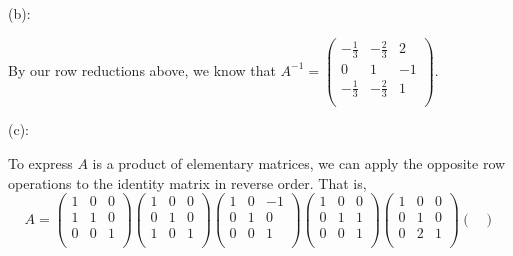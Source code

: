 \documentclass{eh-homework}
\begin{document}
\begin{question}{2}
        \medskip

        (b):

        By our row reductions above, we know that \(A^{-1} = \begin{pmatrix}
            -\frac{1}{3} & -\frac{2}{3} & 2 \\
            0 & 1 & -1 \\
            -\frac{1}{3} & -\frac{2}{3} & 1 \\
        \end{pmatrix}\).

        \medskip

        (c):

        To express \(A\) is a product of elementary matrices, we can apply the opposite row operations to the identity matrix in reverse order. That is,
        \[
            A = \begin{pmatrix}
                1 & 0 &  0 \\
                1 & 1 &  0 \\
                0 & 0 &  1 \\
            \end{pmatrix}
            \begin{pmatrix}
                1 & 0 &  0 \\
                0 & 1 &  0 \\
                1 & 0 &  1 \\
            \end{pmatrix}
            \begin{pmatrix}
                1 & 0 &  -1 \\
                0 & 1 &  0 \\
                0 & 0 &  1 \\
            \end{pmatrix}
            \begin{pmatrix}
                1 & 0 &  0 \\
                0 & 1 &  1 \\
                0 & 0 &  1 \\
            \end{pmatrix}
            \begin{pmatrix}
                1 & 0 &  0 \\
                0 & 1 &  0 \\
                0 & 2 &  1 \\
            \end{pmatrix}
            \begin{pmatrix}

\end{pmatrix}\]
\end{question}
\end{document}
